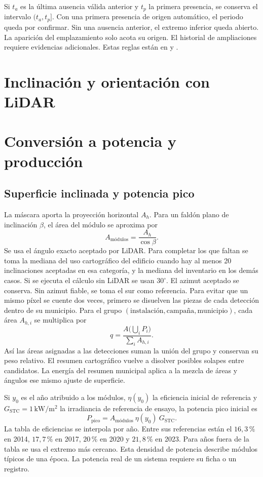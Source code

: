 \documentclass[11pt,a4paper]{article}
\begin{document}
Si \(t_a\) es la última ausencia válida anterior y \(t_p\) la primera presencia, se conserva el intervalo \((t_a,t_p]\). Con una primera presencia de origen automático, el periodo queda por confirmar. Sin una ausencia anterior, el extremo inferior queda abierto. La aparición del emplazamiento solo acota su origen. El historial de ampliaciones requiere evidencias adicionales. Estas reglas están en  y .

\section{Inclinación y orientación con LiDAR}



\section{Conversión a potencia y producción}

\subsection{Superficie inclinada y potencia pico}

La máscara aporta la proyección horizontal \(A_h\). Para un faldón plano de inclinación \(\beta\), el área del módulo se aproxima por
\[
A_{\text{módulos}}=\frac{A_h}{\cos\beta}.
\]
Se usa el ángulo exacto aceptado por LiDAR. Para completar los que faltan se toma la mediana del uso cartográfico del edificio cuando hay al menos 20 inclinaciones aceptadas en esa categoría, y la mediana del inventario en los demás casos. Si se ejecuta el cálculo sin LiDAR se usan \(30^\circ\). El azimut aceptado se conserva. Sin azimut fiable, se toma el sur como referencia. Para evitar que un mismo píxel se cuente dos veces, primero se disuelven las piezas de cada detección dentro de su municipio. Para el grupo \((\text{instalación},\text{campaña},\text{municipio})\), cada área \(A_{h,i}\) se multiplica por
\[
q=\frac{A\bigl(\bigcup_i P_i\bigr)}{\sum_i A_{h,i}}.
\]
Así las áreas asignadas a las detecciones suman la unión del grupo y conservan su peso relativo. El resumen cartográfico vuelve a disolver posibles solapes entre candidatos. La energía del resumen municipal aplica a la mezcla de áreas y ángulos ese mismo ajuste de superficie.

Si \(y_0\) es el año atribuido a los módulos, \(\eta(y_0)\) la eficiencia inicial de referencia y \(G_{\mathrm{STC}}=1\,\mathrm{kW/m^2}\) la irradiancia de referencia de ensayo, la potencia pico inicial es
\[
P_{\mathrm{pico}}=A_{\text{módulos}}\ \eta(y_0)\ G_{\mathrm{STC}}.
\]
La tabla de eficiencias se interpola por año. Entre sus referencias están el \(16{,}3\,\%\) en 2014, \(17{,}7\,\%\) en 2017, \(20\,\%\) en 2020 y \(21{,}8\,\%\) en 2023. Para años fuera de la tabla se usa el extremo más cercano. Esta densidad de potencia describe módulos típicos de una época. La potencia real de un sistema requiere su ficha o un registro. \cite{eficiencia}
\end{document}
